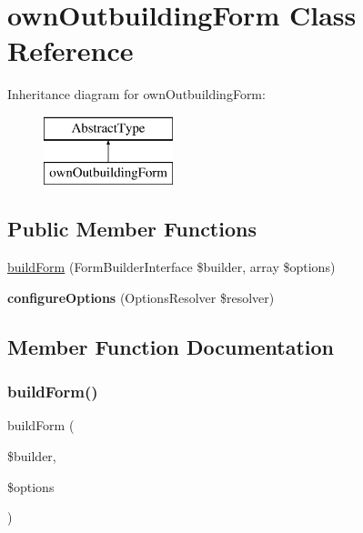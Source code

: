 \hypertarget{class_app_1_1_forms_1_1own_outbuilding_form}{}\section{own\+Outbuilding\+Form Class Reference}
\label{class_app_1_1_forms_1_1own_outbuilding_form}
Inheritance diagram for own\+Outbuilding\+Form\+:\begin{figure}[H]
\begin{center}
\leavevmode
\includegraphics[height=2.000000cm]{class_app_1_1_forms_1_1own_outbuilding_form}
\end{center}
\end{figure}
\subsection*{Public Member Functions}
\begin{DoxyCompactItemize}
\item 
\mbox{\hyperlink{class_app_1_1_forms_1_1own_outbuilding_form_a83c3745710374f9c5a1eb0686fe2dfab}{build\+Form}} (Form\+Builder\+Interface \$builder, array \$options)
\item 
\mbox{\label{class_app_1_1_forms_1_1own_outbuilding_form_a8ff68a86f5090b5df973286836e46ead}} 
{\bfseries configure\+Options} (Options\+Resolver \$resolver)
\end{DoxyCompactItemize}


\subsection{Member Function Documentation}
\mbox{\label{class_app_1_1_forms_1_1own_outbuilding_form_a83c3745710374f9c5a1eb0686fe2dfab}} 
\subsubsection{\texorpdfstring{buildForm()}{buildForm()}}
{\footnotesize\ttfamily build\+Form (\begin{DoxyParamCaption}\item[{Form\+Builder\+Interface}]{\$builder,  }\item[{array}]{\$options }\end{DoxyParamCaption})}


